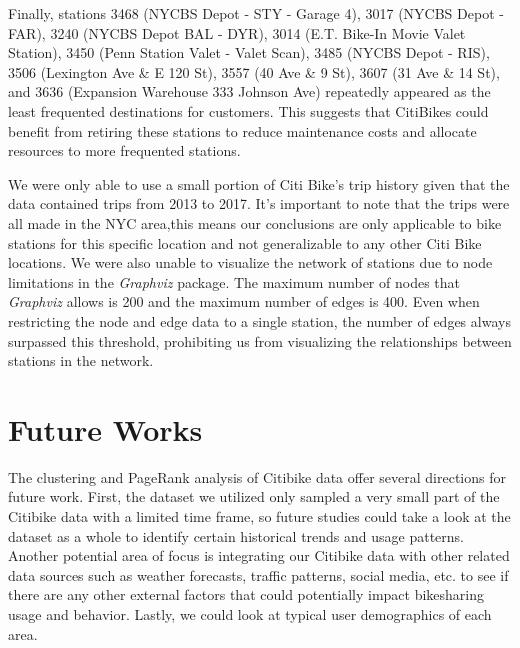 \documentclass{article}
\begin{document}
 \par
Finally, stations 3468 (NYCBS Depot - STY - Garage 4), 3017 (NYCBS Depot - FAR), 3240 (NYCBS Depot BAL - DYR), 3014 (E.T. Bike-In Movie Valet Station), 3450 (Penn Station Valet - Valet Scan), 3485 (NYCBS Depot - RIS), 3506 (Lexington Ave \& E 120 St), 3557 (40 Ave \& 9 St), 3607 (31 Ave \& 14 St), and 3636 (Expansion Warehouse 333 Johnson Ave) repeatedly appeared as the least frequented destinations for customers. This suggests that CitiBikes could benefit from retiring these stations to reduce maintenance costs and allocate resources to more frequented stations. 
\par
We were only able to use a small portion of Citi Bike's trip history given that the data contained trips from 2013 to 2017. It's important to note that the trips were all made in the NYC area,this means our conclusions are only applicable to bike stations for this specific location and not generalizable to any other Citi Bike locations. We were also unable to visualize the  network of stations due to node limitations in the \emph{Graphviz} package. The maximum number of nodes that \emph{Graphviz} allows is 200 and the maximum number of edges is 400. Even when restricting the node and edge data to a single station, the number of edges always surpassed this threshold, prohibiting us from visualizing the relationships between stations in the network.

\section{Future Works}
The clustering and PageRank analysis of Citibike data offer several directions for future work. First, the dataset we utilized only sampled a very small part of the Citibike data with a limited time frame, so future studies could take a look at the dataset as a whole to identify certain historical trends and usage patterns. Another potential area of focus is integrating our Citibike data with other related data sources such as weather forecasts, traffic patterns, social media, etc. to see if there are any other external factors that could potentially impact bikesharing usage and behavior. Lastly, we could look at typical user demographics of each area.
\end{document}

